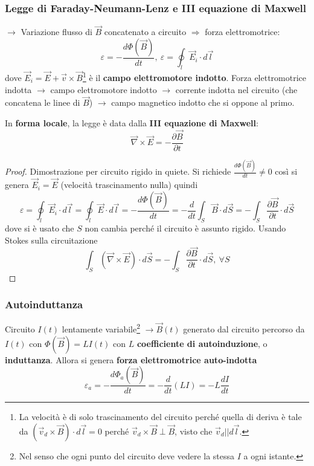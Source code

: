 \documentclass[10pt, a4paper]{scrartcl}
\numberwithin{equation}{subsection}
\theoremstyle{style1}
\newenvironment{boxenv}[1][]{
    \begin{eqbox}[#1]
    }{
   \end{eqbox}
}
\begin{document}
\subsubsection{Legge di Faraday-Neumann-Lenz e III equazione di Maxwell}
$\to$ Variazione flusso di $\vec{B}$ concatenato a circuito $\Rightarrow $ forza elettromotrice:
\begin{equation}
	\varepsilon  = - \frac{d \Phi(\vec{B})}{d t}, \ \varepsilon = \oint_{l} \vec{E}_i \cdot d\vec{l}
\end{equation}
dove $\vec{E}_i = \vec{E}+ \vec{v}\times \vec{B}$\footnote{La velocit\`a \`e di solo trascinamento del circuito perch\'e quella di deriva \`e tale da $(\vec{v}_d \times \vec{B}) \cdot d\vec{l}=0$ perch\'e $\vec{v}_d \times \vec{B}\perp \vec{B}$, visto che $\vec{v}_d | | d\vec{l}$.} \`e il \textbf{campo elettromotore indotto}. Forza elettromotrice indotta $\to$ campo elettromotore indotto $\to$ corrente indotta nel circuito (che concatena le linee di $\vec{B}$) $\to$ campo magnetico indotto che si oppone al primo.

In \textbf{forma locale}, la legge \`e data dalla \textbf{III equazione di Maxwell}:
\begin{equation}
	\vec{\nabla }\times \vec{E} = - \frac{\partial \vec{B}}{\partial t} 
\end{equation}
\begin{boxenv}[]
\begin{proof}
	Dimostrazione per circuito rigido in quiete. Si richiede $\frac{d \Phi(\vec{B})}{d t} \neq 0$ cos\`i si genera $\vec{E}_i = \vec{E}$ (velocit\`a trascinamento nulla) quindi
	\[
	\varepsilon  = \oint_{l} \vec{E}_i \cdot d\vec{l}=\oint_{l} \vec{E}\cdot d\vec{l} = - \frac{d \Phi(\vec{B})}{d t} = - \frac{d }{d t} \int_{S} \vec{B}\cdot d\vec{S} = - \int_{S} \frac{\partial \vec{B}}{\partial t} \cdot d\vec{S}
	\] 
	dove si \`e usato che $S$ non cambia perch\'e il circuito \`e assunto rigido. Usando Stokes sulla circuitazione
	\begin{equation*}
		\int_{S} (\vec{\nabla }\times \vec{E}) \cdot d\vec{S}=- \int_{S} \frac{\partial \vec{B}}{\partial t} \cdot d\vec{S}, \ \forall S
	\end{equation*}
\end{proof}
\end{boxenv}
\subsubsection{Autoinduttanza}

Circuito $I(t)$ lentamente variabile\footnote{Nel senso che ogni punto del circuito deve vedere la stessa $I$ a ogni istante.} $\to \vec{B}(t)$ generato dal circuito percorso da $I(t)$ con $ \Phi(\vec{B}) = L I(t)$ con $L$ \textbf{coefficiente di autoinduzione}, o \textbf{induttanza}. Allora si genera \textbf{forza elettromotrice auto-indotta} 
\begin{equation}
	\varepsilon _a = - \frac{d \Phi_a(\vec{B})}{dt} = - \frac{d }{d t} (LI) = - L \frac{d I}{d t} 
\end{equation}
\end{document}
